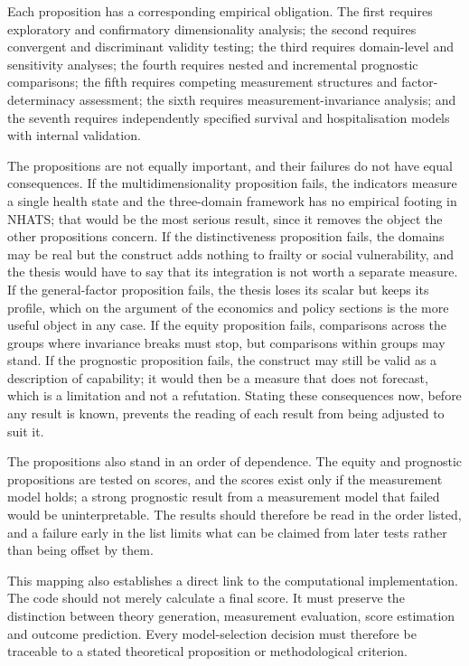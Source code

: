 Each proposition has a corresponding empirical obligation. The first requires exploratory and confirmatory dimensionality analysis; the second requires convergent and discriminant validity testing; the third requires domain-level and sensitivity analyses; the fourth requires nested and incremental prognostic comparisons; the fifth requires competing measurement structures and factor-determinacy assessment; the sixth requires measurement-invariance analysis; and the seventh requires independently specified survival and hospitalisation models with internal validation.

The propositions are not equally important, and their failures do not have equal consequences. If the multidimensionality proposition fails, the indicators measure a single health state and the three-domain framework has no empirical footing in NHATS; that would be the most serious result, since it removes the object the other propositions concern. If the distinctiveness proposition fails, the domains may be real but the construct adds nothing to frailty or social vulnerability, and the thesis would have to say that its integration is not worth a separate measure. If the general-factor proposition fails, the thesis loses its scalar but keeps its profile, which on the argument of the economics and policy sections is the more useful object in any case. If the equity proposition fails, comparisons across the groups where invariance breaks must stop, but comparisons within groups may stand. If the prognostic proposition fails, the construct may still be valid as a description of capability; it would then be a measure that does not forecast, which is a limitation and not a refutation. Stating these consequences now, before any result is known, prevents the reading of each result from being adjusted to suit it.

The propositions also stand in an order of dependence. The equity and prognostic propositions are tested on scores, and the scores exist only if the measurement model holds; a strong prognostic result from a measurement model that failed would be uninterpretable. The results should therefore be read in the order listed, and a failure early in the list limits what can be claimed from later tests rather than being offset by them.

This mapping also establishes a direct link to the computational implementation. The code should not merely calculate a final score. It must preserve the distinction between theory generation, measurement evaluation, score estimation and outcome prediction. Every model-selection decision must therefore be traceable to a stated theoretical proposition or methodological criterion.

